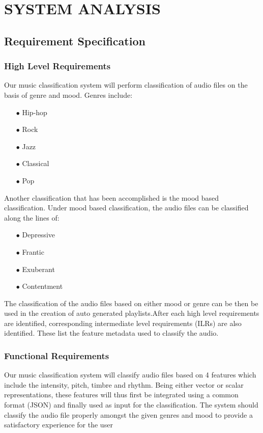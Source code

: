 \newpage
\section{SYSTEM ANALYSIS}
\subsection{Requirement Specification}
\subsubsection{High Level Requirements}
    Our music classification system will perform classification of audio files on the basis of genre and mood. Genres include:
    \begin{itemize}
    \item[$\bullet$] Hip-hop
    \item[$\bullet$] Rock
    \item[$\bullet$] Jazz
    \item[$\bullet$] Classical
    \item[$\bullet$] Pop
    \end{itemize}
    Another classification that has been accomplished is the mood based classification. Under mood based classification, the audio files can be classified along the lines of:
    \begin{itemize}
    \item[$\bullet$] Depressive
    \item[$\bullet$] Frantic
    \item[$\bullet$] Exuberant
    \item[$\bullet$] Contentment
    \end{itemize}
    The classification of the audio files based on either mood or genre can be then be used in the creation of auto generated playlists.After each high level requirements are identified, corresponding intermediate level requirements
    (ILRs) are also identified. These list the feature metadata used to classify the audio.
\subsubsection{Functional Requirements}
    Our music classification system will classify audio files based on 4 features which include the intensity, pitch, timbre and rhythm. Being either vector or scalar representations, these features will thus first be integrated
    using a common format (JSON) and finally used as input for the classification. The system should classify the audio file properly amongst the given genres and mood to provide a satisfactory experience for the user
\newpage
